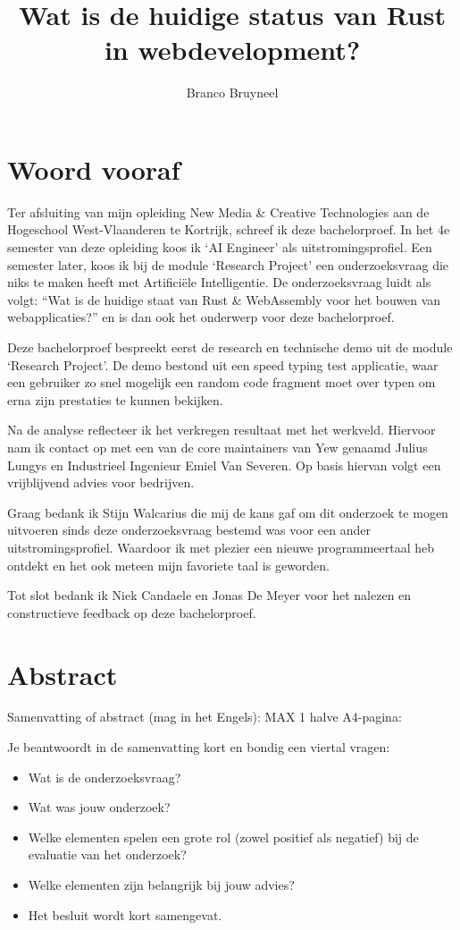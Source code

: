 \documentclass[11pt,a4paper,oneside]{book}
\author{Branco Bruyneel}
\title{Wat is de huidige status van Rust in webdevelopment?}
\begin{document}
\maketitle

\chapter*{Woord vooraf}
Ter afsluiting van mijn opleiding New Media \& Creative Technologies aan de
Hogeschool West-Vlaanderen te Kortrijk, schreef ik deze bachelorproef.  In het
4e semester van deze opleiding koos ik ‘AI Engineer’ als uitstromingsprofiel.
Een semester later, koos ik bij de module ‘Research Project’ een
onderzoeksvraag die niks te maken heeft met Artificiële Intelligentie. De
onderzoeksvraag luidt als volgt: “Wat is de huidige staat van Rust \&
WebAssembly voor het bouwen van webapplicaties?” en is dan ook het onderwerp
voor deze bachelorproef. 

Deze bachelorproef bespreekt eerst de research en technische demo uit de module
‘Research Project’. De demo bestond uit een speed typing test applicatie, waar
een gebruiker zo snel mogelijk een random code fragment moet over typen om erna
zijn prestaties te kunnen bekijken. 

Na de analyse reflecteer ik het verkregen resultaat met het werkveld. Hiervoor
nam ik contact op met een van de core maintainers van Yew genaamd Julius Lungys
en Industrieel Ingenieur Emiel Van Severen. Op basis hiervan volgt een
vrijblijvend advies voor bedrijven. 

Graag bedank ik Stijn Walcarius die mij de kans gaf om dit onderzoek te mogen
uitvoeren sinds deze onderzoeksvraag bestemd was voor een ander
uitstromingsprofiel. Waardoor ik met plezier een nieuwe programmeertaal heb
ontdekt en het ook meteen mijn favoriete taal is geworden. 

Tot slot bedank ik Niek Candaele en Jonas De Meyer voor het nalezen en
constructieve feedback op deze bachelorproef.

\chapter*{Abstract}
Samenvatting of abstract (mag in het Engels): MAX 1 halve A4-pagina:  

Je beantwoordt in de samenvatting kort en bondig een viertal vragen:  
\begin{itemize}
  \item Wat is de onderzoeksvraag? 
  \item Wat was jouw onderzoek?  
  \item Welke elementen spelen een grote rol (zowel positief als negatief) bij
    de evaluatie van het onderzoek?  
  \item Welke elementen zijn belangrijk bij jouw advies? 
  \item Het besluit wordt kort samengevat.
\end{itemize}
\end{document}
